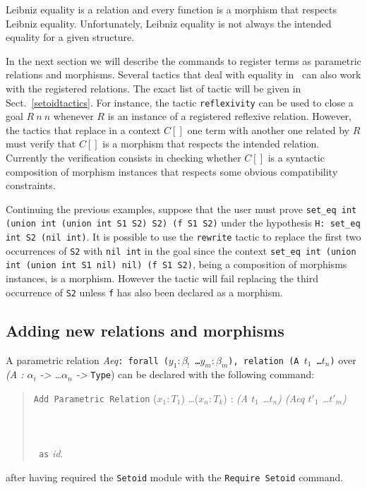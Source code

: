 Leibniz equality is a relation and every function is a
morphism that respects Leibniz equality. Unfortunately, Leibniz equality
is not always the intended equality for a given structure.

In the next section we will describe the commands to register terms as
parametric relations and morphisms. Several tactics that deal with equality
in \Coq\ can also work with the registered relations.
The exact list of tactic will be given in Sect.~\ref{setoidtactics}.
For instance, the
tactic \texttt{reflexivity} can be used to close a goal $R~n~n$ whenever
$R$ is an instance of a registered reflexive relation. However, the tactics
that replace in a context $C[]$ one term with another one related by $R$
must verify that $C[]$ is a morphism that respects the intended relation.
Currently the verification consists in checking whether $C[]$ is a syntactic
composition of morphism instances that respects some obvious
compatibility constraints.

\begin{cscexample}[Rewriting]
Continuing the previous examples, suppose that the user must prove
\texttt{set\_eq int (union int (union int S1 S2) S2) (f S1 S2)} under the
hypothesis \texttt{H: set\_eq int S2 (nil int)}. It is possible to
use the \texttt{rewrite} tactic to replace the first two occurrences of
\texttt{S2} with \texttt{nil int} in the goal since the context
\texttt{set\_eq int (union int (union int S1 nil) nil) (f S1 S2)}, being
a composition of morphisms instances, is a morphism. However the tactic
will fail replacing the third occurrence of \texttt{S2} unless \texttt{f}
has also been declared as a morphism.
\end{cscexample}

\subsection{Adding new relations and morphisms}
A parametric relation
\textit{Aeq}\texttt{: forall ($y_1 : \beta_!$ \ldots $y_m : \beta_m$), relation (A $t_1$ \ldots $t_n$)} over
\textit{(A : $\alpha_i$ -> \ldots $\alpha_n$ -> }\texttt{Type})
can be declared with the following command:

\begin{quote}
  \texttt{Add Parametric Relation} ($x_1 : T_1$) \ldots ($x_n : T_k$) :
  \textit{(A $t_1$ \ldots $t_n$) (Aeq $t'_1$ \ldots $t'_m$)}\\
  ~\\
  ~\\
  ~\\
  \texttt{~as} \textit{id}.
\end{quote}
after having required the \texttt{Setoid} module with the
\texttt{Require Setoid} command.

